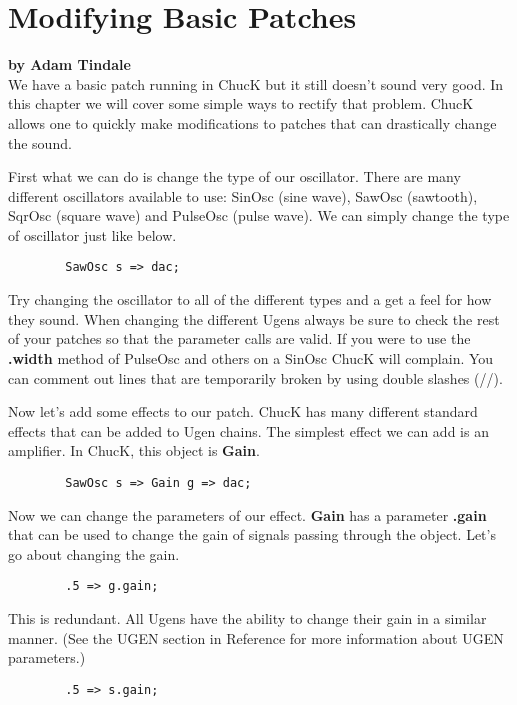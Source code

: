 \section{Modifying Basic Patches}
\textbf{by Adam Tindale}\\

We have a basic patch running in ChucK but it still doesn't sound very good. In this chapter we will cover some simple ways to rectify that problem. ChucK allows one to quickly make modifications to patches that can drastically change the sound.

First what we can do is change the type of our oscillator. There are many different oscillators available to use: SinOsc (sine wave), SawOsc (sawtooth), SqrOsc (square wave) and  PulseOsc (pulse wave). We can simply change the type of oscillator just like below. 

\begin{verbatim}
        SawOsc s => dac;
\end{verbatim}

Try changing the oscillator to all of the different types and a get a feel for how they sound. When changing the different Ugens always be sure to check the rest of your patches so that the parameter calls are valid. If you were to use the {\bf .width} method of PulseOsc and others on a SinOsc ChucK will complain. You can comment out lines that are temporarily broken by using double slashes (//).

Now let's add some effects to our patch. ChucK has many different standard effects that can be added to Ugen chains. The simplest effect we can add is an amplifier. In ChucK, this object is {\bf Gain}.

\begin{verbatim}
        SawOsc s => Gain g => dac;
\end{verbatim}

Now we can change the parameters of our effect. {\bf Gain} has a parameter {\bf .gain} that can be used to change the gain  of signals passing through the object. Let's go about changing the gain.

\begin{verbatim}
        .5 => g.gain;
\end{verbatim}

This is redundant. All Ugens have the ability to change their gain in a similar manner. (See the UGEN section in Reference for more information about UGEN parameters.)

\begin{verbatim}
        .5 => s.gain;
\end{verbatim}

